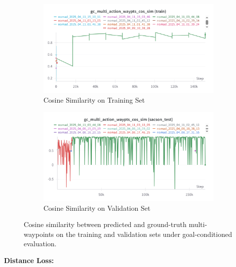 \documentclass[12pt]{article}
\begin{document}
\begin{figure}[H]
    \centering
    \begin{subfigure}[b]{0.48\textwidth}
        \centering
        \includegraphics[width=\textwidth]{images/gc_multi_action_waypts_cos_sim.png}
        \caption{Cosine Similarity on Training Set}
        \label{fig:gc_multi_action_waypts_cos_sim}
    \end{subfigure}
    \hfill
    \begin{subfigure}[b]{0.48\textwidth}
        \centering
        \includegraphics[width=\textwidth]{images/gc_multi_action_waypts_cos_sim_test.png}
        \caption{Cosine Similarity on Validation Set}
        \label{fig:gc_action_multi_waypts_cos_sim_test}
    \end{subfigure}
    \caption{Cosine similarity between predicted and ground-truth multi-waypoints on the training and validation sets under goal-conditioned evaluation.}
\end{figure}
\noindent \textbf{Distance Loss:}\\
\end{document}
